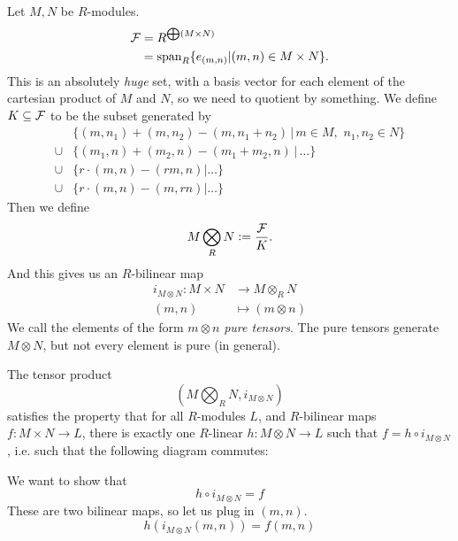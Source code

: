 \documentclass{article}
\begin{document}
\begin{fancydefine}
    Let $M,N$ be $R$-modules. \begin{align*} \mathcal{F} &= R^{\bigoplus(M \times N)} \\ &= \operatorname{span}_{R}\{e_{(m,n)} | (m,n) \in M\times N\}.\end{align*}
    This is an absolutely \textit{huge} set, with a basis vector for each element of the cartesian product of $M$ and $N$, so we need to quotient by something. We define $K \subseteq \mathcal{F}$ to be the subset generated by \begin{align*} &\{(m,n_{1})+(m,n_{2}) - (m,n_{1}+n_{2}) \, | \, m \in M, \, \, n_{1},n_{2} \in N \}\\
    \cup & \{(m_{1},n) + (m_{2},n) - (m_{1} + m_{2}, n) \, | \, \dots \}\\
    \cup & \{r \cdot (m,n) - (rm,n) | \dots \}\\
    \cup & \{r \cdot (m,n) - (m,rn) | \dots \}
    \end{align*}
    Then we define \[ M \bigotimes_{R} N \vcentcolon= \frac{\mathcal{F}}{K}.\]
    And this gives us an $R$-bilinear map
    \begin{align*}
        i_{M \otimes N} : M \times N &\to M \otimes_{R} N\\
        (m,n) &\mapsto (m \otimes n)
    \end{align*}
    We call the elements of the form $m \otimes n$ \textit{pure tensors}. The pure tensors generate $M \otimes N$, but not every element is pure (in general).
\end{fancydefine}
\begin{fancyprop} The tensor product \[ \left(M \bigotimes_{R} N, i_{M\otimes N} \right) \]
satisfies the property that for all $R$-modules $L$, and $R$-bilinear maps $f: M \times N \to L$, there is exactly one $R$-linear $h: M \otimes N \to L$ such that $f=h \circ i_{M \otimes N}$, i.e. such that the following diagram commutes: 
\begin{center} 
\end{center}
\end{fancyprop}
\proof  We want to show that 
\[
    h \circ i_{M \otimes N} = f
\]
These are two bilinear maps, so let us plug in $(m,n)$. \[ h(i_{M\otimes N} (m,n)) = f(m,n) \]
\end{document}
